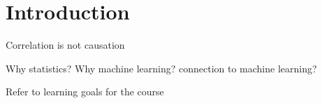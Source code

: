 \chapter{Introduction} \label{ch:introduction}


Correlation is not causation

Why statistics?
    Why machine learning? connection to machine learning?

Refer to learning goals for the course

